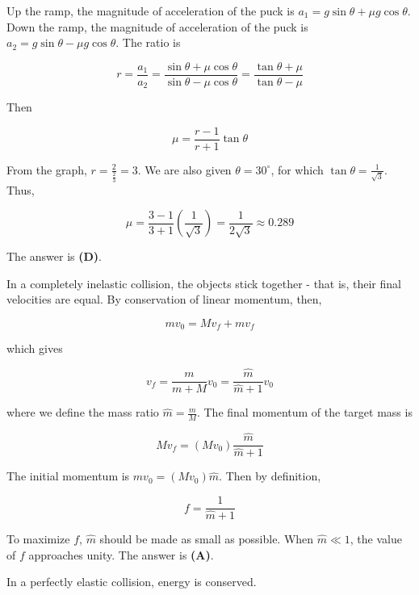 \documentclass[12pt]{article}
\begin{document}
\vspace{2 \baselineskip}



Up the ramp, the magnitude of acceleration of the puck is $a_1 = g \sin \theta + \mu g \cos \theta$. Down the ramp, the magnitude of acceleration of the puck is $a_2 = g \sin \theta - \mu g \cos \theta$. The ratio is

$$r = \frac{a_1}{a_2} = \frac{\sin \theta + \mu \cos \theta}{\sin \theta - \mu \cos \theta} = \frac{\tan \theta + \mu}{\tan \theta - \mu}$$

Then

$$\mu = \frac{r - 1}{r + 1} \tan \theta$$

From the graph, $r = \frac{2}{\frac{2}{3}} = 3$. We are also given $\theta = 30^\circ$, for which $\tan \theta = \frac{1}{\sqrt{3}}$. Thus,

$$\mu = \frac{3 - 1}{3 + 1} \left( \frac{1}{\sqrt{3}} \right) = \frac{1}{2 \sqrt{3}} \approx 0.289$$

The answer is \textbf{(D)}.


\vspace{2 \baselineskip}



In a completely inelastic collision, the objects stick together - that is, their final velocities are equal. By conservation of linear momentum, then,

$$m v_0 = M v_f + m v_f$$

which gives

$$v_f = \frac{m}{m + M} v_0 = \frac{\hat{m}}{\hat{m} + 1} v_0$$

where we define the mass ratio $\hat{m} = \frac{m}{M}$. The final momentum of the target mass is

$$M v_f = (M v_0) \frac{\hat{m}}{\hat{m} + 1}$$

The initial momentum is $m v_0 = (M v_0) \hat{m}$. Then by definition,

$$f = \frac{1}{\hat{m} + 1}$$

To maximize $f$, $\hat{m}$ should be made as small as possible. When $\hat{m} \ll 1$, the value of $f$ approaches unity. The answer is \textbf{(A)}.


\vspace{2 \baselineskip}



In a perfectly elastic collision, energy is conserved.
\end{document}
